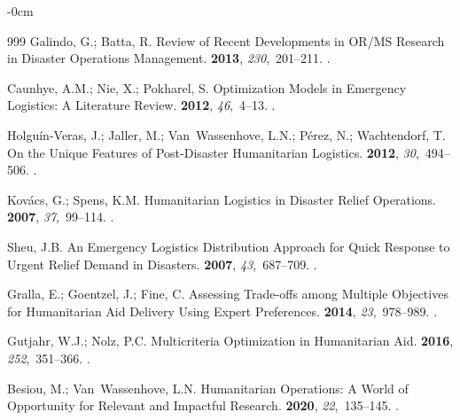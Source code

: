 \documentclass[systems,article,accept,moreauthors,pdftex]{Definitions/mdpi}
\begin{document}
\begin{adjustwidth}{-\extralength}{0cm}
\begin{thebibliography}{999}
Galindo, G.; Batta, R.
\newblock Review of Recent Developments in {OR/MS} Research in Disaster
  Operations Management.
 {\bf 2013}, {\em
  230},~201--211.
.

Caunhye, A.M.; Nie, X.; Pokharel, S.
\newblock Optimization Models in Emergency Logistics: A Literature Review.
 {\bf 2012}, {\em 46},~4--13.
.

Holgu{\'i}n-Veras, J.; Jaller, M.; Van~Wassenhove, L.N.; P{\'e}rez, N.;
  Wachtendorf, T.
\newblock On the Unique Features of Post-Disaster Humanitarian Logistics.
 {\bf 2012}, {\em
  30},~494--506.
.

Kov{\'a}cs, G.; Spens, K.M.
\newblock Humanitarian Logistics in Disaster Relief Operations.
 {\bf 2007}, {\em 37},~99--114.
.

Sheu, J.B.
\newblock An Emergency Logistics Distribution Approach for Quick Response to
  Urgent Relief Demand in Disasters.
 {\bf 2007}, {\em 43},~687--709.
.

Gralla, E.; Goentzel, J.; Fine, C.
\newblock Assessing Trade-offs among Multiple Objectives for Humanitarian Aid
  Delivery Using Expert Preferences.
 {\bf 2014}, {\em
  23},~978--989.
.

Gutjahr, W.J.; Nolz, P.C.
\newblock Multicriteria Optimization in Humanitarian Aid.
 {\bf 2016}, {\em
  252},~351--366.
.

Besiou, M.; Van~Wassenhove, L.N.
\newblock Humanitarian Operations: A World of Opportunity for Relevant and
  Impactful Research.
 {\bf 2020}, {\em
  22},~135--145.
.


\end{thebibliography}
\end{adjustwidth}
\end{document}
